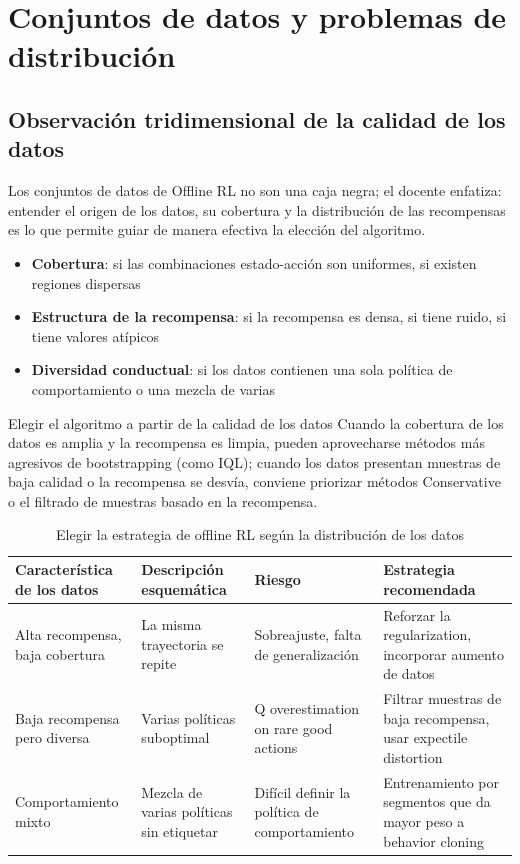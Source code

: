 \section{Conjuntos de datos y problemas de distribución}

\subsection{Observación tridimensional de la calidad de los datos}

Los conjuntos de datos de Offline RL no son una caja negra; el docente enfatiza: entender el origen de los datos, su cobertura y la distribución de las recompensas es lo que permite guiar de manera efectiva la elección del algoritmo.

\begin{itemize}
    \item \textbf{Cobertura}: si las combinaciones estado-acción son uniformes, si existen regiones dispersas
    \item \textbf{Estructura de la recompensa}: si la recompensa es densa, si tiene ruido, si tiene valores atípicos
    \item \textbf{Diversidad conductual}: si los datos contienen una sola política de comportamiento o una mezcla de varias
\end{itemize}

\begin{importantbox}{Elegir el algoritmo a partir de la calidad de los datos}
Cuando la cobertura de los datos es amplia y la recompensa es limpia, pueden aprovecharse métodos más agresivos de bootstrapping (como IQL); cuando los datos presentan muestras de baja calidad o la recompensa se desvía, conviene priorizar métodos Conservative o el filtrado de muestras basado en la recompensa.
\end{importantbox}

\begin{table}[H]
\centering
\begin{tabular}{p{} p{} p{} p{}}
\toprule
Característica de los datos & Descripción esquemática & Riesgo & Estrategia recomendada \\
\midrule
Alta recompensa, baja cobertura & La misma trayectoria se repite & Sobreajuste, falta de generalización & Reforzar la regularization, incorporar aumento de datos \\
Baja recompensa pero diversa & Varias políticas suboptimal & Q overestimation on rare good actions & Filtrar muestras de baja recompensa, usar expectile distortion \\
Comportamiento mixto & Mezcla de varias políticas sin etiquetar & Difícil definir la política de comportamiento & Entrenamiento por segmentos que da mayor peso a behavior cloning \\
\bottomrule
\end{tabular}
\caption{Elegir la estrategia de offline RL según la distribución de los datos}
\end{table}

